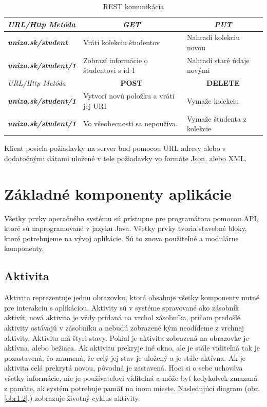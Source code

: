 \begin{table}[H]
\centering
\caption{REST komunikácia}
\label{REST komun}
\begin{tabular}{|l|l|l|}
\hline
\textit{URL/Http Metóda}             & \multicolumn{1}{c|}{\textit{\textbf{GET}}} & \multicolumn{1}{c|}{\textit{\textbf{PUT}}} \\ \hline
\textit{\textbf{uniza.sk/student}}   & Vráti kolekciu študentov                   & Nahradí kolekciu novou                     \\ \hline
\textit{\textbf{uniza.sk/student/1}} & Zobrazí informácie o študentovi s id 1     & Nahradí staré údaje novými                 \\ \hline
\textit{URL/Http Metóda}             & \multicolumn{1}{c|}{\textbf{POST}}         & \multicolumn{1}{c|}{\textbf{DELETE}}       \\ \hline
\textit{\textbf{uniza.sk/student/1}} & Vytvorí novú položku a vráti jej URI       & Vymaže kolekciu                            \\ \hline
\textit{\textbf{uniza.sk/student/1}} & Vo všeobecnosti sa nepoužíva.              & Vymaže študenta z kolekcie                 \\ \hline
\end{tabular}
\end{table}

Klient posiela požiadavky na server buď pomocou URL adresy alebo s dodatočnými dátami uložené v tele požiadavky vo formáte Json, alebo XML.

\section{Základné komponenty aplikácie}
Všetky prvky operačného systému sú prístupne pre programátora pomocou API, ktoré sú naprogramované v jazyku Java. Všetky prvky tvoria stavebné bloky, ktoré potrebujeme na vývoj aplikácie. Sú to znova použiteľné a modulárne komponenty.
\subsection{Aktivita}
 
Aktivita reprezentuje jednu obrazovku, ktorá obsahuje všetky komponenty nutné pre interakciu s aplikáciou. Aktivity sú v systéme  spravované ako zásobník aktivít, nová aktivita je vždy pridaná na vrchol zásobníka, pričom predošlé aktivity ostávajú v zásobníku a nebudú zobrazené kým neodídeme z vrchnej aktivity.
Aktivita má štyri stavy. Pokiaľ je aktivita zobrazená na obrazovke je aktívna, alebo bežiaca. Ak aktivitu prekryje iné okno, ale je stále viditeľná tak je pozastavená, čo znamená, že celý jej stav je uložený a je stále aktívna. Ak je aktivita celá prekrytá novou, pôvodná je zastavená. Hoci si o sebe uchováva všetky informácie, nie je používateľovi viditeľná a môže byť kedykoľvek zmazaná z pamäte, ak systém potrebuje pamäť na inom mieste.
Nasledujúci diagram  (obr.\ref{obr1.2}.) zobrazuje životný cyklus aktivity.

